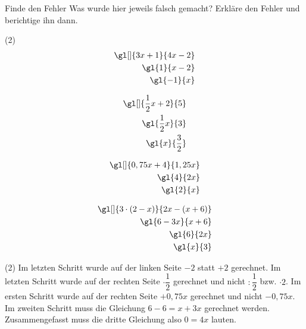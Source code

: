 \documentclass[12pt,a5paper,landscape]{scrartcl}
\begin{document}
\begin{karte2}{Finde den Fehler}
	Was wurde hier jeweils falsch gemacht? Erkläre den Fehler und berichtige ihn dann.
	
	\begin{tasks}(2)
		\task 
		\begin{alignat*}{3}
			\gl[]{3x+1}{4x-2} \\
			\gl{1}{x-2} \\
			\gl{-1}{x}
		\end{alignat*}
		
		\task 
		\begin{alignat*}{3}
			\gl[]{\dfrac{1}{2}x+2}{5} \\
			\gl{\dfrac{1}{2}x}{3} \\
			\gl{x}{\dfrac{3}{2}}
		\end{alignat*}
		
		\task 
		\begin{alignat*}{3}
			\gl[]{0,75x+4}{1,25x} \\
			\gl{4}{2x} \\
			\gl{2}{x}
		\end{alignat*}
		
		\task
		\begin{alignat*}{3}
			\gl[]{3\cdot (2-x)}{2x-(x+6)} \\
			\gl{6-3x}{x+6} \\
			\gl{6}{2x} \\
			\gl{x}{3}
		\end{alignat*}
	\end{tasks}
\end{karte2}

\begin{loesungskarte}
	\begin{tasks}(2)
		\task Im letzten Schritt wurde auf der linken Seite $-2$ statt $+2$ gerechnet.
		\task Im letzten Schritt wurde auf der rechten Seite $\cdot\dfrac{1}{2}$ gerechnet und nicht $:\dfrac{1}{2}$ bzw. $\cdot 2$.
		\task Im ersten Schritt wurde auf der rechten Seite $+0,75x$ gerechnet und nicht $-0,75x$.
		\task Im zweiten Schritt muss die Gleichung $6-6=x+3x$ gerechnet werden. Zusammengefasst muss die dritte Gleichung also $0=4x$ lauten.
	\end{tasks}
\end{loesungskarte}
\end{document}
